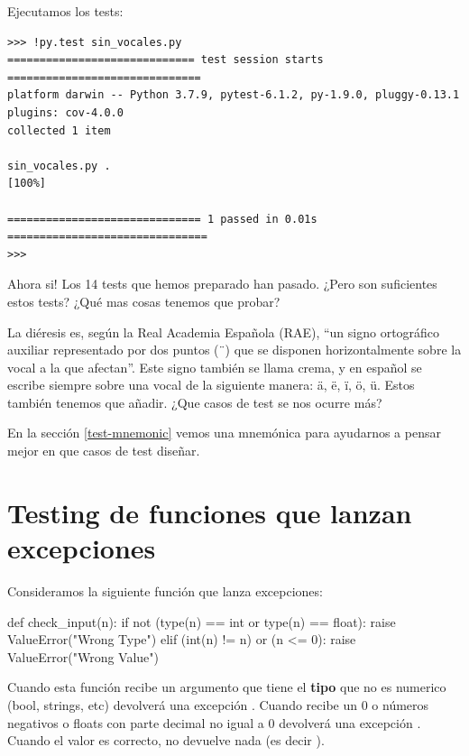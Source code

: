 Ejecutamos los tests:


\begin{footnotesize}
\begin{Verbatim}[frame=single]
>>> !py.test sin_vocales.py
============================= test session starts ==============================
platform darwin -- Python 3.7.9, pytest-6.1.2, py-1.9.0, pluggy-0.13.1
plugins: cov-4.0.0
collected 1 item

sin_vocales.py .                                                         [100%]

============================== 1 passed in 0.01s ===============================
>>> 
\end{Verbatim}
\end{footnotesize}

Ahora si! Los 14 tests que hemos preparado han pasado. ¿Pero son suficientes estos tests? ¿Qué mas cosas tenemos que probar?

La diéresis es, según la Real Academia Española (RAE), “un signo ortográfico auxiliar representado por dos puntos (¨) que se disponen horizontalmente sobre la vocal a la que afectan”. Este signo también se llama crema, y en español se escribe siempre sobre una vocal de la siguiente manera: ä, ë, ï, ö, ü. Estos también tenemos que añadir. ¿Que casos de test se nos ocurre más?

En la sección \ref{test-mnemonic} vemos una mnemónica para ayudarnos a pensar mejor en que casos de test diseñar.


\section{Testing de funciones que lanzan excepciones}\label{test-excep}

Consideramos la siguiente función  que lanza excepciones:

\begin{python}
def check_input(n):
    if not (type(n) == int or type(n) == float):
        raise ValueError("Wrong Type")
    elif (int(n) != n) or (n <= 0):
        raise ValueError("Wrong Value")
\end{python}

Cuando esta función recibe un argumento que tiene el \textbf{tipo} que no es numerico (bool, strings, etc) devolverá una excepción . Cuando recibe un 0 o números negativos o floats con parte decimal no igual a 0  devolverá una excepción . Cuando el valor es correcto, no devuelve nada (es decir ).


